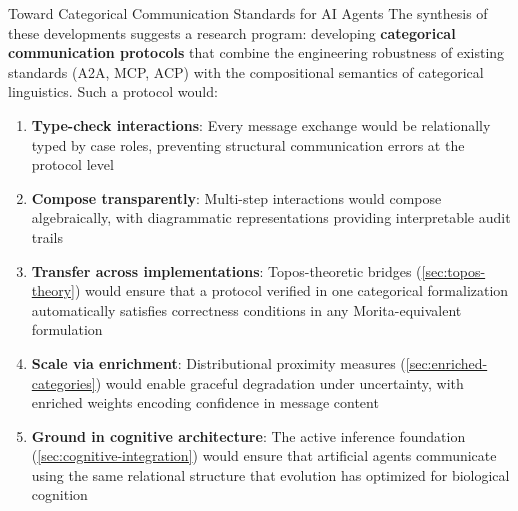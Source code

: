\documentclass[
  ignorenonframetext,
]{beamer}
\providecommand{\tightlist}{%
  \setlength{\itemsep}{0pt}\setlength{\parskip}{0pt}}
\begin{document}
\begin{frame}{Toward Categorical Communication Standards for AI Agents}
\protect{}\label{toward-categorical-communication-standards-for-ai-agents}
The synthesis of these developments suggests a research program:
developing \textbf{categorical communication protocols} that combine the
engineering robustness of existing standards (A2A, MCP, ACP) with the
compositional semantics of categorical linguistics. Such a protocol
would:

\begin{enumerate}
\tightlist
\item
  \textbf{Type-check interactions}: Every message exchange would be
  relationally typed by case roles, preventing structural communication
  errors at the protocol level
\item
  \textbf{Compose transparently}: Multi-step interactions would compose
  algebraically, with diagrammatic representations providing
  interpretable audit trails
\item
  \textbf{Transfer across implementations}: Topos-theoretic bridges
  (\autoref{sec:topos-theory}) would ensure that a protocol verified in
  one categorical formalization automatically satisfies correctness
  conditions in any Morita-equivalent formulation
\item
  \textbf{Scale via enrichment}: Distributional proximity measures
  (\autoref{sec:enriched-categories}) would enable graceful degradation
  under uncertainty, with enriched weights encoding confidence in
  message content
\item
  \textbf{Ground in cognitive architecture}: The active inference
  foundation (\autoref{sec:cognitive-integration}) would ensure that
  artificial agents communicate using the same relational structure that
  evolution has optimized for biological cognition
\end{enumerate}
\end{frame}
\end{document}
